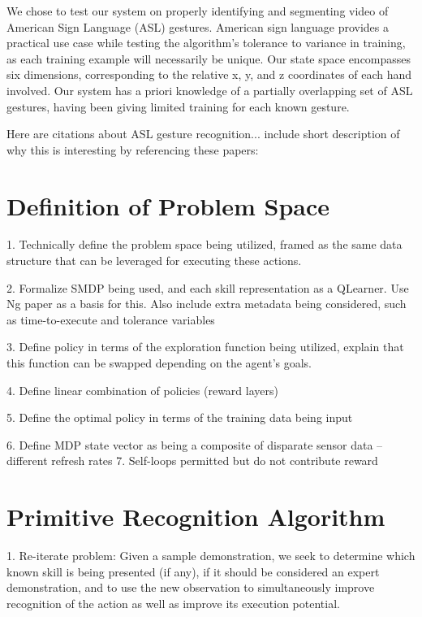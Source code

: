 \documentclass[letterpaper]{article}
\begin{document}
We chose to test our system on properly identifying and segmenting video of American Sign Language (ASL) gestures.
American sign language provides a practical use case while testing the algorithm's tolerance to variance in training, as each training 
example will necessarily be unique. Our state space encompasses six dimensions, corresponding to the relative x, y, and z coordinates of each hand involved.
Our system has a priori knowledge of a partially overlapping set of ASL gestures, having been giving limited training for each known gesture.

Here are citations about ASL gesture recognition... include short description of why this is interesting by referencing these papers:
\cite{HandGestures}\cite{HSMMRecognition}\cite{POMDPGesture}
\cite{HoughASL}\cite{ASLRealTime}\cite{MotionASL}


\section{Definition of Problem Space}
\label{sec:pspace}

1. Technically define the problem space being utilized, framed as the same data structure that
   can be leveraged for executing these actions. 

2. Formalize SMDP being used, and each skill representation as a QLearner. Use Ng paper as a basis for this. Also include extra metadata
   being considered, such as time-to-execute and tolerance variables

3. Define policy in terms of the exploration function being utilized, explain that this function can be swapped
   depending on the agent's goals.

4. Define linear combination of policies (reward layers)

5. Define the optimal policy in terms of the training data being input

6. Define MDP state vector as being a composite of disparate sensor data -- different refresh rates
7. Self-loops permitted but do not contribute reward


\section{Primitive Recognition Algorithm}
\label{sec:recognition}
1. Re-iterate problem: Given a sample demonstration, we seek to determine which known skill is being presented (if any),
                       if it should be considered an expert demonstration, and to use the new observation to simultaneously
                       improve recognition of the action as well as improve its execution potential.
\end{document}
